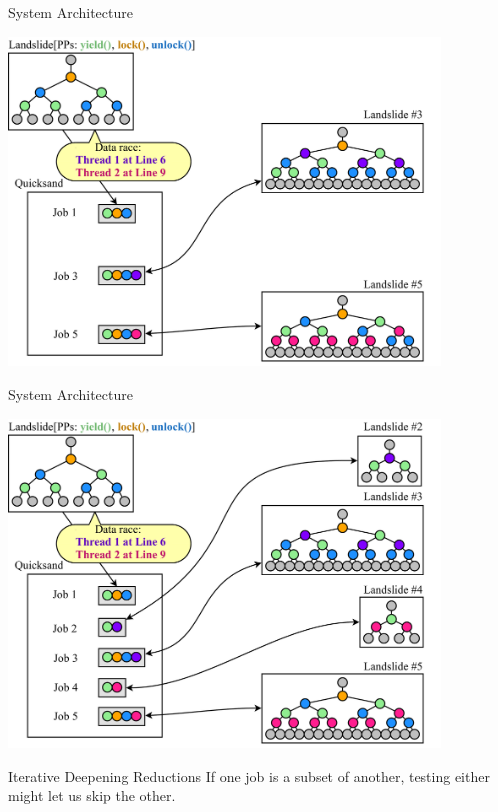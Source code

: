 \documentclass[xcolor=dvipsnames]{beamer}
\begin{document}
\begin{frame}{System Architecture}
	\begin{center}
	\vspace{-0.88em}
	\includegraphics[width=0.86\textwidth]{dr-jobs-3.pdf}
	\end{center}
\end{frame}
\begin{frame}{System Architecture}
	\begin{center}
	\vspace{-0.88em}
	\includegraphics[width=0.86\textwidth]{dr-jobs-4.pdf}
	\end{center}
\end{frame}

\begin{frame}{Iterative Deepening Reductions}
	If one job is a subset of another, testing either might let us skip the other.
\end{frame}
\end{document}

